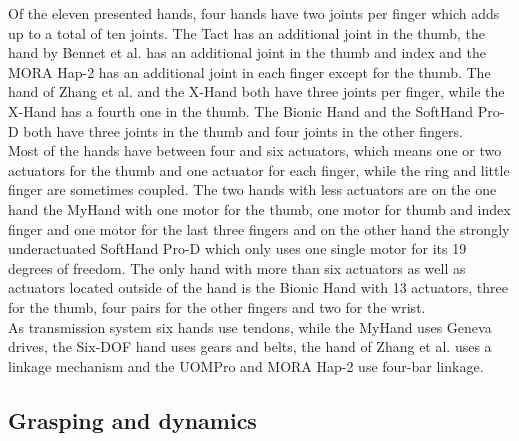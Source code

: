 \documentclass[a4paper, 10pt, conference]{ieeeconf}      %
\begin{document}
Of the eleven presented hands, four hands have two joints per finger which adds up to a total of ten joints. The Tact has an additional joint in the thumb, the hand by Bennet et al. has an additional joint in the thumb and index and the MORA Hap-2 has an additional joint in each finger except for the thumb. The hand of Zhang et al. and the X-Hand both have three joints per finger, while the X-Hand has a fourth one in the thumb. The Bionic Hand and the SoftHand Pro-D both have three joints in the thumb and four joints in the other fingers.\\
Most of the hands have between four and six actuators, which means one or two actuators for the thumb and one actuator for each finger, while the ring and little finger are sometimes coupled. The two hands with less actuators are on the one hand the MyHand with one motor for the thumb, one motor for thumb and index finger and one motor for the last three fingers and on the other hand the strongly underactuated SoftHand Pro-D which only uses one single motor for its 19 degrees of freedom. The only hand with more than six actuators as well as actuators located outside of the hand is the Bionic Hand with 13 actuators, three for the thumb, four pairs for the other fingers and two for the wrist.\\
As transmission system six hands use tendons, while the MyHand uses Geneva drives, the Six-DOF hand uses gears and belts, the hand of Zhang et al. uses a linkage mechanism and the UOMPro and MORA Hap-2 use four-bar linkage.

\subsection{Grasping and dynamics}
\end{document}
